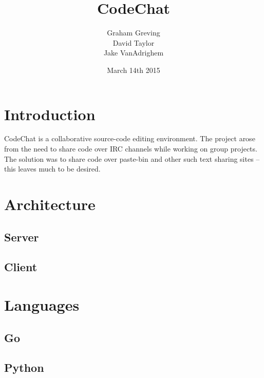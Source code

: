 \documentclass[10pt, letterpaper]{article}
\title{CodeChat}
\author{Graham Greving \\ David Taylor \\ Jake VanAdrighem}
\date{March 14th 2015}
\begin{document}
\maketitle

\section*{Introduction}

CodeChat is a collaborative source-code editing environment. The project
arose from the need to share code over IRC channels while working on group 
projects. The solution was to share code over paste-bin and other such text 
sharing sites -- this leaves much to be desired.

\section*{Architecture}

\subsection*{Server}

\subsection*{Client}

\section*{Languages}

\subsection*{Go}

\subsection*{Python}
\end{document}
